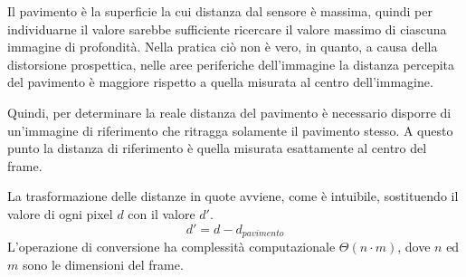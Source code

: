 Il pavimento è la superficie la cui distanza dal sensore è massima, quindi per individuarne il valore sarebbe sufficiente ricercare il valore massimo di ciascuna immagine di profondità.
Nella pratica ciò non è vero, in quanto, a causa della distorsione prospettica, nelle aree periferiche dell'immagine la distanza percepita del pavimento è maggiore rispetto a quella misurata al centro dell'immagine.

Quindi, per determinare la reale distanza del pavimento è necessario disporre di un'immagine di riferimento che ritragga solamente il pavimento stesso. A questo punto la distanza di riferimento è quella misurata esattamente al centro del frame.

La trasformazione delle distanze in quote avviene, come è intuibile, sostituendo il valore di ogni pixel $d$ con il valore $d'$.
\begin{equation}
    d' = d - d_{pavimento}
    \label{eq:floor_distance}
\end{equation}
L'operazione di conversione ha complessità computazionale $\Theta(n \cdot m)$, dove $n$ ed $m$ sono le dimensioni del frame.
